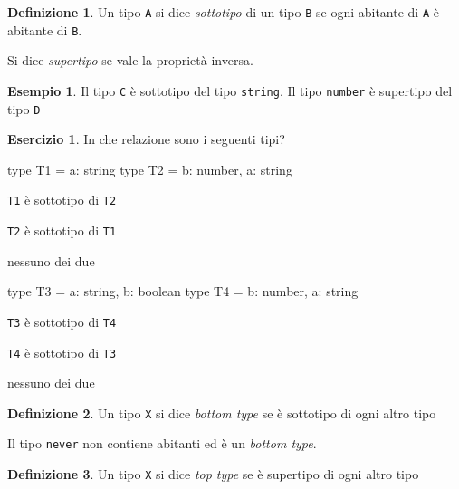 \documentclass[12pt]{article}
\theoremstyle{definition}
\newtheorem{definition}{Definizione}[section]
\newtheorem{example}{Esempio}[subsection]
\newtheorem{exercise}{Esercizio}[subsection]
\newenvironment{code}
  {\vspace{0.5cm} \VerbatimEnvironment\begin{typescriptcode}}
  {\end{typescriptcode} \vspace{0.2cm}}
\begin{document}
\begin{definition}
Un tipo \texttt{A} si dice \emph{sottotipo} di un tipo \texttt{B} se ogni abitante di \texttt{A} è abitante di \texttt{B}.

Si dice \emph{supertipo} se vale la proprietà inversa.
\end{definition}

\begin{example}
Il tipo \texttt{C} è sottotipo del tipo \texttt{string}.
Il tipo \texttt{number} è supertipo del tipo \texttt{D}
\end{example}

\begin{exercise}
In che relazione sono i seguenti tipi?

\begin{code}
type T1 = { a: string }
type T2 = { b: number, a: string }
\end{code}

\begin{todolist}
\item \texttt{T1} è sottotipo di \texttt{T2}
\item \texttt{T2} è sottotipo di \texttt{T1}
\item nessuno dei due
\end{todolist}

\begin{code}
type T3 = { a: string, b: boolean }
type T4 = { b: number, a: string }
\end{code}

\begin{todolist}
\item \texttt{T3} è sottotipo di \texttt{T4}
\item \texttt{T4} è sottotipo di \texttt{T3}
\item nessuno dei due
\end{todolist}
\end{exercise}

\begin{definition}
Un tipo \texttt{X} si dice \emph{bottom type} se è sottotipo di ogni altro tipo
\end{definition}

Il tipo \texttt{never} non contiene abitanti ed è un \emph{bottom type}.

\begin{definition}
Un tipo \texttt{X} si dice \emph{top type} se è supertipo di ogni altro tipo
\end{definition}
\end{document}
